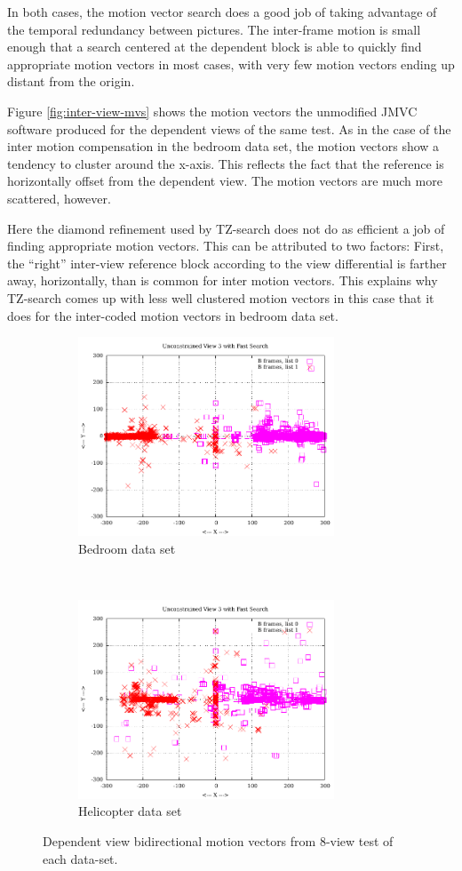 \documentclass{sig-alternate-05-2015}
\begin{document}
In both cases, the motion vector search does a good job of taking advantage of
the temporal redundancy between pictures. The inter-frame motion is small enough
that a search centered at the dependent block is able to quickly find appropriate
motion vectors in most cases, with very few motion vectors ending up distant from
the origin.

Figure \ref{fig:inter-view-mvs} shows the motion vectors the unmodified JMVC
software produced for the dependent views of the same test. As in the case
of the inter motion compensation in the bedroom data set, the motion vectors
show a tendency to cluster around the x-axis. This reflects the fact that the
reference is horizontally offset from the dependent view. The motion vectors
are much more scattered, however.

Here the diamond refinement used by TZ-search does not do as efficient a job of
finding appropriate motion vectors. This can be attributed to two factors:
First, the ``right'' inter-view reference block according to the view
differential is farther away, horizontally, than is common for inter motion
vectors. This explains why TZ-search comes up with less well clustered motion
vectors in this case that it does for the inter-coded motion vectors in
bedroom data set.

\begin{figure}[H]
\centering
\begin{subfigure}{.5\textwidth}
\centering
\includegraphics[width=3in]{figures/bedroom1-inter-view-bimvs1.pdf}
\caption{Bedroom data set}
\label{fig:bedroom-inter-view-bimvs1}
\end{subfigure} \\
\begin{subfigure}{.5\textwidth}
\centering
\includegraphics[width=3in]{figures/helicopter-inter-view-bimvs1.pdf}
\caption{Helicopter data set}
\label{fig:helicopter-inter-view-bimvs1}
\end{subfigure}
\caption{Dependent view bidirectional motion vectors from 8-view test of each
data-set.}
\label{fig:inter-view-bimvs1}
\end{figure}
\end{document}
